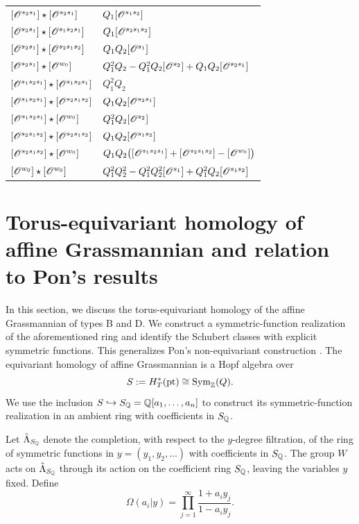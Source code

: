 \documentclass[a4paper]{amsart}
\theoremstyle{remark}
\numberwithin{equation}{section}
\begin{document}
\begin{longtable}{@{}>{\raggedright\arraybackslash}p{}
                       >{\raggedright\arraybackslash}p{}@{}}
$[\mathscr{O}^{s_2s_1}]\star [\mathscr{O}^{s_2s_1}]$
& $Q_1[\mathscr{O}^{s_1s_2}]$ \\
$[\mathscr{O}^{s_2s_1}]\star [\mathscr{O}^{s_1s_2s_1}]$
& $Q_1[\mathscr{O}^{s_2s_1s_2}]$ \\
$[\mathscr{O}^{s_2s_1}]\star [\mathscr{O}^{s_2s_1s_2}]$
& $Q_1Q_2[\mathscr{O}^{s_1}]$ \\
$[\mathscr{O}^{s_2s_1}]\star [\mathscr{O}^{w_0}]$
& $Q_1^2Q_2-Q_1^2Q_2[\mathscr{O}^{s_2}]+Q_1Q_2[\mathscr{O}^{s_2s_1}]$ \\
\addlinespace

$[\mathscr{O}^{s_1s_2s_1}]\star [\mathscr{O}^{s_1s_2s_1}]$
& $Q_1^2Q_2$ \\
$[\mathscr{O}^{s_1s_2s_1}]\star [\mathscr{O}^{s_2s_1s_2}]$
& $Q_1Q_2[\mathscr{O}^{s_2s_1}]$ \\
$[\mathscr{O}^{s_1s_2s_1}]\star [\mathscr{O}^{w_0}]$
& $Q_1^2Q_2[\mathscr{O}^{s_2}]$ \\
\addlinespace

$[\mathscr{O}^{s_2s_1s_2}]\star [\mathscr{O}^{s_2s_1s_2}]$
& $Q_1Q_2[\mathscr{O}^{s_1s_2}]$ \\
$[\mathscr{O}^{s_2s_1s_2}]\star [\mathscr{O}^{w_0}]$
& $Q_1Q_2\bigl([\mathscr{O}^{s_1s_2s_1}]+[\mathscr{O}^{s_2s_1s_2}]-[\mathscr{O}^{w_0}]\bigr)$ \\
\addlinespace

$[\mathscr{O}^{w_0}]\star [\mathscr{O}^{w_0}]$
& $Q_1^2Q_2^2-Q_1^2Q_2^2[\mathscr{O}^{s_1}]+Q_1^2Q_2[\mathscr{O}^{s_1s_2}]$ \\

\end{longtable}
\endgroup





\section{Torus-equivariant homology of affine Grassmannian and relation to Pon's results}\label{S:eq_hom}



In this section, we discuss the torus-equivariant homology of the affine Grassmannian of types B and D. We construct a symmetric-function realization of the aforementioned ring and identify the Schubert classes with explicit symmetric functions. This generalizes Pon's non-equivariant construction \cite{Pon}. The equivariant homology of affine Grassmannian is a Hopf algebra over
\[
S:=H_T^*(\mathrm{pt})\cong\operatorname{Sym}_{\mathbb{Z}}(Q).
\]
We use the inclusion
$S\hookrightarrow
{S}_{\mathbb{Q}}=\mathbb{Q}[a_1,\ldots,a_n]$
to construct its symmetric-function realization in an ambient
ring with coefficients in ${S_{\mathbb{Q}}}$.




Let $\hat{\Lambda}_{{S_{\mathbb{Q}}}}$ denote the completion, with respect
to the $y$-degree filtration, of the ring of symmetric functions
in $y=(y_1,y_2,\ldots)$ with coefficients in ${S_{\mathbb{Q}}}$.
The group $W$ acts on $\hat{\Lambda}_{{S_{\mathbb{Q}}}}$ through its action on the coefficient ring ${S_{\mathbb{Q}}}$, leaving the variables $y$ fixed. Define
\begin{equation}
\Omega(a_i| y) =\prod_{j=1}^\infty \frac{1+a_iy_j}{
1-a_i y_j
}.
\end{equation}
\end{document}
